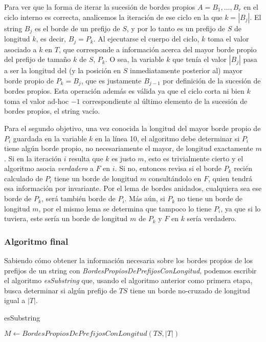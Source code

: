 Para ver que la forma de iterar la sucesión de bordes propios $A = B_1, \dots, B_r$ en el ciclo interno es correcta, analicemos la iteración de ese ciclo en la que $k = |B_j|$. El string $B_j$ es el borde de un prefijo de $S$, y por lo tanto es un prefijo de $S$ de longitud $k$, es decir, $B_j = P_k$. Al ejecutarse el cuerpo del ciclo, $k$ toma el valor asociado a $k$ en $T$, que corresponde a información acerca del mayor borde propio del prefijo de tamaño $k$ de $S$, $P_k$. O sea, la variable $k$ que tenía el valor $|B_j|$ pasa a ser la longitud del (y la posición en $S$ inmediatamente posterior al) mayor borde propio de $P_k = B_j$, que es justamente $B_{j-1}$ por definición de la sucesión de bordes propios. Esta operación además es válida ya que el ciclo corta ni bien $k$ toma el valor ad-hoc $-1$ correspondiente al último elemento de la sucesión de  bordes propios, el string vacío.

\medskip

Para el segundo objetivo, una vez conocida la longitud del mayor borde propio de $P_i$ guardada en la variable $k$ en la línea 10, el algoritmo debe determinar si $P_i$ tiene algún borde propio, no necesariamente el mayor, de longitud exactamente $m$. Si en la iteración $i$ resulta que $k$ es justo $m$, esto es trivialmente cierto y el algoritmo asocia \textit{verdadero} a $F$ en $i$. Si no, entonces revisa si el borde $P_k$ recién calculado de $P_i$ tiene un borde de longitud $m$ consultándolo en $F$, quien tendrá esa información por invariante. Por el lema de bordes anidados, cualquiera sea ese borde de $P_k$, será también borde de $P_i$. Más aún, si $P_k$ no tiene un borde de longitud $m$, por el mismo lema se determina que tampoco lo tiene $P_i$, ya que si lo tuviera, este sería un borde de longitud $m$ de $P_k$ y $F$ en $k$ sería verdadero.
 
\subsubsection{Algoritmo final}

Sabiendo cómo obtener la información necesaria sobre los bordes propios de los prefijos de un string con \textit{BordesPropiosDePrefijosConLongitud}, podemos escribir el algoritmo \textit{esSubstring} que, usando el algoritmo anterior como primera etapa, busca determinar si algún prefijo de $TS$ tiene un borde no-cruzado de longitud igual a $|T|$.

\bigskip

\begin{algorithm}[H]
	\caption{esSubstring}

	$M \gets \mathit{BordesPropiosDePrefijosConLongitud}(TS, |T|)$
	
	 {
		 {
		}
	}

\end{algorithm}

